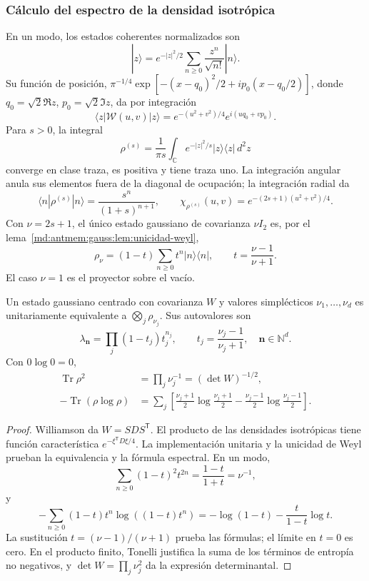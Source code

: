 \subsubsection{Cálculo del espectro de la densidad isotrópica}
En un modo, los estados coherentes normalizados son
\[
 |z\rangle=e^{-|z|^2/2}\sum_{n\geq0}\frac{z^n}{\sqrt{n!}}|n\rangle.
\]
Su función de posición,
\(\pi^{-1/4}\exp[-(x-q_0)^2/2+ip_0(x-q_0/2)]\), donde
\(q_0=\sqrt2\Re z\), \(p_0=\sqrt2\Im z\), da por integración
\[
 \langle z|\mathcal W(u,v)|z\rangle
 =e^{-(u^2+v^2)/4}e^{i(uq_0+vp_0)}.
\]
Para \(s>0\), la integral
\[
 \rho^{(s)}=\frac1{\pi s}\int_{\mathbb C} e^{-|z|^2/s}
 |z\rangle\langle z|\,d^2z
\]
converge en clase traza, es positiva y tiene traza uno. La integración
angular anula sus elementos fuera de la diagonal de ocupación; la
integración radial da
\[
 \langle n|\rho^{(s)}|n\rangle=\frac{s^n}{(1+s)^{n+1}},\qquad
 \chi_{\rho^{(s)}}(u,v)=e^{-(2s+1)(u^2+v^2)/4}.
\]
Con \(\nu=2s+1\), el único estado gaussiano de covarianza
\(\nu I_2\) es, por el lema~\ref{md:antmem:gauss:lem:unicidad-weyl},
\begin{equation}
 \rho_\nu=(1-t)\sum_{n\geq0}t^n|n\rangle\langle n|,
 \qquad t=\frac{\nu-1}{\nu+1}.
 \label{md:antmem:gauss:eq:estado-geometrico}
\end{equation}
El caso \(\nu=1\) es el proyector sobre el vacío.

\begin{theorem}
\label{md:antmem:gauss:thm:espectro-gaussiano}
Un estado gaussiano centrado con covarianza \(W\) y valores
simplécticos \(\nu_1,\ldots,\nu_d\) es unitariamente equivalente
a \(\bigotimes_j\rho_{\nu_j}\). Sus autovalores son
\[
 \lambda_{\mathbf n}=\prod_j(1-t_j)t_j^{n_j},\qquad
 t_j=\frac{\nu_j-1}{\nu_j+1},\quad \mathbf n\in\mathbb N^d.
\]
Con \(0\log0=0\),
\begin{align}
 \operatorname{Tr}\rho^2&=\prod_j\nu_j^{-1}=(\det W)^{-1/2},
 \label{md:antmem:gauss:eq:pureza-general}\\
 -\operatorname{Tr}(\rho\log\rho)&=\sum_j
 \left[\frac{\nu_j+1}{2}\log\frac{\nu_j+1}{2}
 -\frac{\nu_j-1}{2}\log\frac{\nu_j-1}{2}\right].
 \label{md:antmem:gauss:eq:entropia-general}
\end{align}
\end{theorem}
\begin{proof}
Williamson da \(W=SDS^{\mathsf T}\). El producto de las densidades
isotrópicas tiene función característica \(e^{-\xi^{\mathsf T}D\xi/4}\).
La implementación unitaria y la unicidad de Weyl prueban la
equivalencia y la fórmula espectral. En un modo,
\[
 \sum_{n\geq0}(1-t)^2t^{2n}=\frac{1-t}{1+t}=\nu^{-1},
\]
y
\[
 -\sum_{n\geq0}(1-t)t^n\log((1-t)t^n)
 =-\log(1-t)-\frac{t}{1-t}\log t.
\]
La sustitución \(t=(\nu-1)/(\nu+1)\) prueba las fórmulas; el
límite en \(t=0\) es cero. En el producto finito, Tonelli justifica
la suma de los términos de entropía no negativos, y
\(\det W=\prod_j\nu_j^2\) da la expresión determinantal.
\end{proof}

